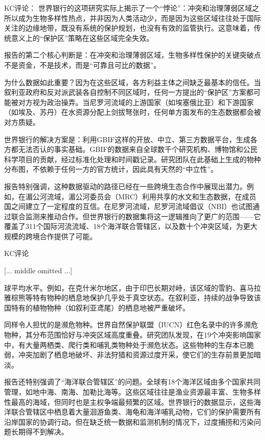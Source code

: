 \documentclass[11pt]{ctexart}
\begin{document}
KC评论： 世界银行的这项研究实际上揭示了一个“悖论”：冲突和治理薄弱区域之所以成为生物多样性热点，并非因为人类活动少，而是因为这些区域往往处于国际关注的边缘地带，既没有系统的保护规划，也没有有效的监管执行。这意味着，传统意义上的“保护区”策略在这些区域完全失效。

报告的第二个核心判断是：在冲突和治理薄弱区域，生物多样性保护的关键突破点不是资金，不是技术，而是“可靠且可比的数据”。

为什么数据如此重要？因为在这些区域，各方利益主体之间缺乏最基本的信任。当叙利亚政府和反对派武装各自控制不同区域时，任何一方提出的“保护区”方案都可能被对方视为政治操弄。当尼罗河流域的上游国家（如埃塞俄比亚）和下游国家（如埃及、苏丹）在水资源分配上剑拔弩张时，任何单方面发布的生态数据都会被对方质疑。

世界银行的解决方案是：利用GBIF这样的开放、中立、第三方数据平台，生成各方都无法否认的事实基础。GBIF的数据来自全球数千个研究机构、博物馆和公民科学项目的贡献，经过标准化处理和时间戳记录。研究团队在此基础上生成的物种分布图，不依赖于任何一方的官方统计，因此具有天然的“中立性”。

报告特别强调，这种数据驱动的路径已经在一些跨境生态合作中展现出潜力。例如，在湄公河流域，湄公河委员会（MRC）利用共享的水文和生态数据，在成员国之间建立了一定程度的互信。在尼罗河流域，尼罗河流域倡议（NBI）也试图通过联合监测来推动合作。但世界银行的数据集将这一逻辑推向了更广的范围——它覆盖了311个国际河流流域、18个海洋联合管辖区，以及数十个冲突区域，为更大规模的跨境合作提供了可能。

KC评论

[... middle omitted ...]

球平均水平。例如，在克什米尔地区，由于印巴长期对峙，该区域的雪豹、喜马拉雅棕熊等特有物种的栖息地保护几乎处于真空状态。在叙利亚，持续的战争导致该国特有的植物物种（如叙利亚鸢尾）的栖息地被严重破坏。

同样令人担忧的是濒危物种。世界自然保护联盟（IUCN）红色名录中的许多濒危物种，其分布范围恰好与冲突区域高度重叠。研究团队发现，在19个冲突影响国家中，有大量两栖类、爬行类和哺乳类物种处于濒危状态。这些物种的生存本已脆弱，冲突加剧了栖息地破坏、非法狩猎和资源过度开采，使它们的生存前景更加暗淡。

报告还特别强调了“海洋联合管辖区”的问题。全球有18个海洋区域由多个国家共同管理，如地中海、南海、加勒比海等。这些区域往往是渔业资源最丰富、生物多样性最高的海域，但同时也是主权争端最频繁的区域。世界银行的数据显示，这些海洋联合管辖区中栖息着大量洄游鱼类、海龟和海洋哺乳动物，它们的保护需要所有沿岸国家的协调行动。但在缺乏统一数据和监测机制的情况下，过度捕捞和污染问题长期得不到解决。
\end{document}
